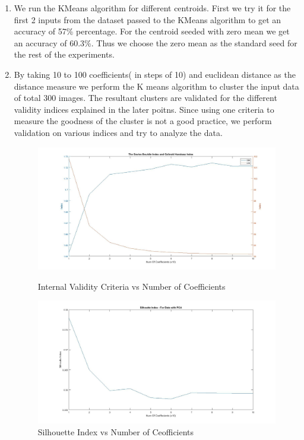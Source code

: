 \documentclass[conference]{IEEEtran}
\begin{document}
\begin{enumerate}
\item We run the KMeans algorithm for different centroids. First we try it for the first 2 inputs from the dataset passed to the KMeans algorithm to get an accuracy of 57\% percentage. For the centroid seeded with zero mean we get an accuracy of 60.3\%. Thus we choose the zero mean as the standard seed for the rest of the experiments. 


\item By taking 10 to 100 coefficients( in steps of 10)  and euclidean distance as the distance measure we perform the K means algorithm to cluster the input data of total 300 images. The resultant clusters are validated for the different validity indices explained in the later poitns. Since using one criteria to measure the goodness of the cluster is not a good practice, we perform validation on various indices and try to analyze the data. 
\begin{figure}
\centering
\includegraphics[width=20cm]{IndexVSNumberofCoeffecients.jpg}
\caption{Internal Validity Criteria vs Number of Coefficients}
\includegraphics[width=20cm]{Silhoutte_Index}
\caption{Silhouette Index vs Number of Ceofficients}
\label{Internal}

\end{figure}
\end{enumerate}
\end{document}
